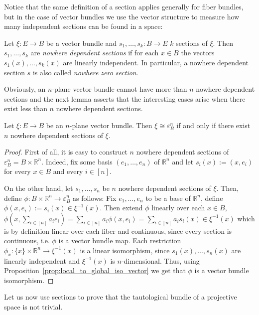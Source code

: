 Notice that the same definition of a section applies generally for fiber bundles, but in the case of vector bundles we use the vector structure to measure how many independent sections can be found in a space:

\begin{definition} Let $\xi:E\to B$ be a vector bundle and $s_1,\ldots,s_k:B\to E$ $k$ sections of $\xi$. Then $s_1,\ldots,s_k$ are \emph{nowhere dependent sections} if for each $x\in B$ the vectors $s_1(x),\ldots,s_k(x)$ are linearly independent. In particular, a nowhere dependent section $s$ is also called \emph{nowhere zero section}.
\end{definition}

Obviously, an $n$-plane vector bundle cannot have more than $n$ nowhere dependent sections and the next lemma asserts that the interesting cases arise when there exist less than $n$ nowhere dependent sections.

\begin{lemma}\label{lem:n_sections_makes_trivial} Let $\xi:E\to B$ be an $n$-plane vector bundle. Then $\xi\cong\varepsilon_B^n$ if and only if there exist $n$ nowhere dependent sections of $\xi$.
\end{lemma}
\begin{proof} First of all, it is easy to construct $n$ nowhere dependent sections of $\varepsilon_B^n=B\times\mathbb{R}^n$. Indeed, fix some basis $(e_1,\ldots,e_n)$ of $\mathbb{R}^n$ and let $s_i(x):=(x,e_i)$ for every $x\in B$ and every $i\in[n]$.

On the other hand, let $s_1,\ldots,s_n$ be $n$ nowhere dependent sections of $\xi$. Then, define $\phi:B\times\mathbb{R}^n\to\varepsilon_B^n$ as follows: Fix $e_1,\ldots,e_n$ to be a base of $\mathbb{R}^n$, define $\phi(x,e_i):=s_i(x)\in\xi^{-1}(x)$. Then extend $\phi$ linearly over each $x\in B$,
$\phi\left(x,\sum_{i\in[n]}a_ie_i\right)=\sum_{i\in[n]}a_i\phi(x,e_i)=\sum_{i\in[n]}a_is_i(x)\in\xi^{-1}(x)$
which is by definition linear over each fiber and continuous, since every section is continuous, i.e. $\phi$ is a vector bundle map. Each restriction $\phi_x:\{x\}\times\mathbb{R}^n\to\xi^{-1}(x)$ is a linear isomorphism, since $s_1(x),\ldots,s_n(x)$ are linearly independent and $\xi^{-1}(x)$ is $n$-dimensional. Thus, using Proposition~\ref{prop:local_to_global_iso_vector} we get that $\phi$ is a vector bundle isomorphism.
\end{proof}

Let us now use sections to prove that the tautological bundle of a projective space is not trivial.

